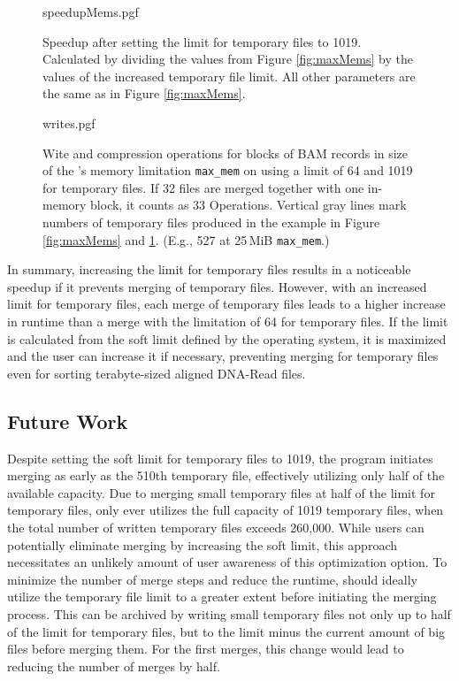 \begin{figure}
        {speedupMems.pgf}
    \caption{Speedup after setting the limit for temporary files to 1019. Calculated by dividing the values from Figure \ref{fig:maxMems} by the values of the increased temporary file limit. All other parameters are the same as in Figure \ref{fig:maxMems}.}
    \label{fig:memSpeedup}
\end{figure}

\begin{figure}
        {writes.pgf}
    \caption{
    Wite and compression operations for blocks of BAM records in size of the \sort's memory limitation \texttt{max\_mem} on using a limit of 64 and 1019 for temporary files. If 32 files are merged together with one in-memory block, it counts as 33 Operations. Vertical gray lines mark numbers of temporary files produced in the example in Figure \ref{fig:maxMems} and \ref{fig:memSpeedup}. (E.g., 527 at 25\,MiB \texttt{max\_mem}.)
    }
    \label{fig:writes}
\end{figure}

In summary, increasing the limit for temporary files results in a noticeable speedup if it prevents merging of temporary files. However, with an increased limit for temporary files, each merge of temporary files leads to a higher increase in runtime than a merge with the limitation of 64 for temporary files. If the limit is calculated from the soft limit defined by the operating system, it is maximized and the user can increase it if necessary, preventing merging for temporary files even for sorting terabyte-sized aligned DNA-Read files. 

\subsection{Future Work}
Despite setting the soft limit for temporary files to 1019, the program initiates merging as early as the 510th temporary file, effectively utilizing only half of the available capacity. Due to merging small temporary files at half of the limit for temporary files, \sort only ever utilizes the full capacity of 1019 temporary files, when the total number of written temporary files exceeds 260,000. While users can potentially eliminate merging by increasing the soft limit, this approach necessitates an unlikely amount of user awareness of this optimization option. To minimize the number of merge steps and reduce the runtime, \sort should ideally utilize the temporary file limit to a greater extent before initiating the merging process. This can be archived by writing small temporary files not only up to half of the limit for temporary files, but to the limit minus the current amount of big files before merging them. For the first merges, this change would lead to reducing the number of merges by half.
